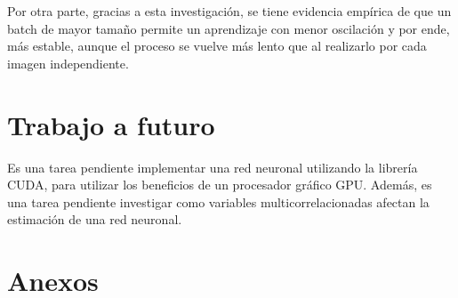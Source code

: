 \documentclass[journal]{IEEEtran}
\begin{document}
Por otra parte, gracias a esta investigación, se tiene evidencia empírica de que un batch de mayor tamaño permite un aprendizaje con menor oscilación y por ende, más estable, aunque el proceso se vuelve más lento que al realizarlo por cada imagen independiente.


\section{Trabajo a futuro}

Es una tarea pendiente implementar una red neuronal utilizando la librería CUDA, para utilizar los beneficios de un procesador gráfico GPU. Además, es una tarea pendiente investigar como variables multicorrelacionadas afectan la estimación de una red neuronal.
\cite{2014MachineLoss}

\ifCLASSOPTIONcaptionsoff
  \newpage
\fi





\section*{Anexos}
\end{document}
